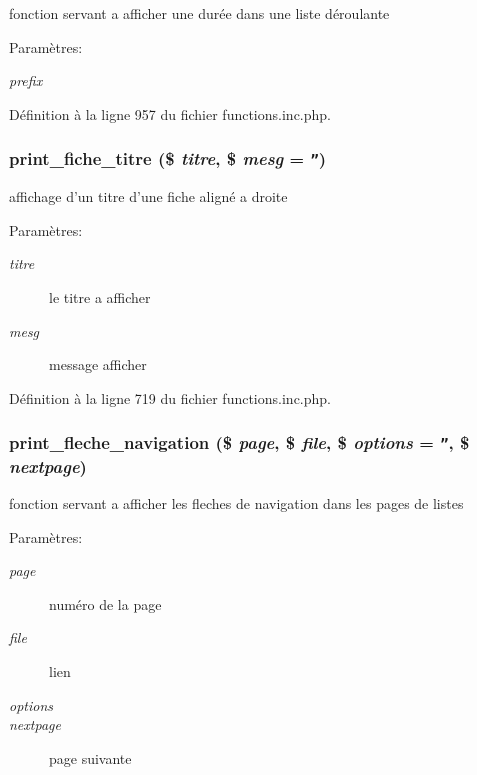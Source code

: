 fonction servant a afficher une dur\'{e}e dans une liste d\'{e}roulante 

\begin{Desc}
\item[Param\`{e}tres:]
\begin{description}
\item[{\em prefix}]\end{description}
\end{Desc}


D\'{e}finition \`{a} la ligne 957 du fichier functions.inc.php.\hypertarget{functions_8inc_8php_a29}{
\subsubsection[print\_\-fiche\_\-titre]{\setlength{\rightskip}{0pt plus 5cm}print\_\-fiche\_\-titre (\$ {\em titre}, \$ {\em mesg} = {\tt ''})}}
\label{functions_8inc_8php_a29}


affichage d'un titre d'une fiche align\'{e} a droite 

\begin{Desc}
\item[Param\`{e}tres:]
\begin{description}
\item[{\em titre}]le titre a afficher \item[{\em mesg}]message afficher \end{description}
\end{Desc}


D\'{e}finition \`{a} la ligne 719 du fichier functions.inc.php.\hypertarget{functions_8inc_8php_a33}{
\subsubsection[print\_\-fleche\_\-navigation]{\setlength{\rightskip}{0pt plus 5cm}print\_\-fleche\_\-navigation (\$ {\em page}, \$ {\em file}, \$ {\em options} = {\tt ''}, \$ {\em nextpage})}}
\label{functions_8inc_8php_a33}


fonction servant a afficher les fleches de navigation dans les pages de listes 

\begin{Desc}
\item[Param\`{e}tres:]
\begin{description}
\item[{\em page}]num\'{e}ro de la page \item[{\em file}]lien \item[{\em options}]\item[{\em nextpage}]page suivante \end{description}
\end{Desc}



